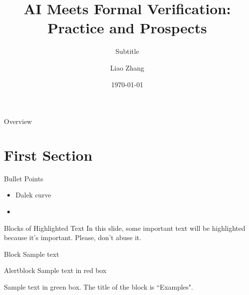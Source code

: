 \documentclass[aspectratio=169,xcolor=dvipsnames]{beamer}
\title[AI Meets Formal Verification]{AI Meets Formal Verification: Practice and Prospects} %
\subtitle{Subtitle}
\author[Pin-Yen] {Liao Zhang}
\institute[NTU] %
{
    Beneficial AI Foundation \\
}
\date{\today} %
\begin{document}
\begin{frame}
    \titlepage
\end{frame}

\begin{frame}{Overview}
    \tableofcontents
\end{frame}

\section{First Section}

\begin{frame}{Bullet Points}
    \begin{itemize}
        \item Dalek curve
        \item 
    \end{itemize}
\end{frame}


\begin{frame}{Blocks of Highlighted Text}
    In this slide, some important text will be \alert{highlighted} because it's important. Please, don't abuse it.

    \begin{block}{Block}
        Sample text
    \end{block}

    \begin{alertblock}{Alertblock}
        Sample text in red box
    \end{alertblock}

    \begin{examples}
        Sample text in green box. The title of the block is ``Examples".
    \end{examples}
\end{frame}
\end{document}
